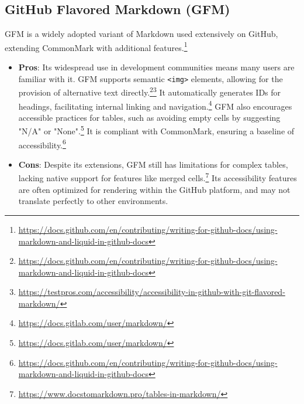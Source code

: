 \subsection{GitHub Flavored Markdown (GFM)}
GFM is a widely adopted variant of Markdown used extensively on GitHub, extending CommonMark with additional features.\footnote{\url{https://docs.github.com/en/contributing/writing-for-github-docs/using-markdown-and-liquid-in-github-docs}}
\begin{itemize}[noitemsep,topsep=0pt]
    \item \textbf{Pros}: Its widespread use in development communities means many users are familiar with it. GFM supports semantic \texttt{<img>} elements, allowing for the provision of alternative text directly.\footnote{\url{https://docs.github.com/en/contributing/writing-for-github-docs/using-markdown-and-liquid-in-github-docs}}\footnote{\url{https://testpros.com/accessibility/accessibility-in-github-with-git-flavored-markdown/}} It automatically generates IDs for headings, facilitating internal linking and navigation.\footnote{\url{https://docs.gitlab.com/user/markdown/}} GFM also encourages accessible practices for tables, such as avoiding empty cells by suggesting "N/A" or "None".\footnote{\url{https://docs.gitlab.com/user/markdown/}} It is compliant with CommonMark, ensuring a baseline of accessibility.\footnote{\url{https://docs.github.com/en/contributing/writing-for-github-docs/using-markdown-and-liquid-in-github-docs}}
    \item \textbf{Cons}: Despite its extensions, GFM still has limitations for complex tables, lacking native support for features like merged cells.\footnote{\url{https://www.docstomarkdown.pro/tables-in-markdown/}} Its accessibility features are often optimized for rendering within the GitHub platform, and may not translate perfectly to other environments.
\end{itemize}

